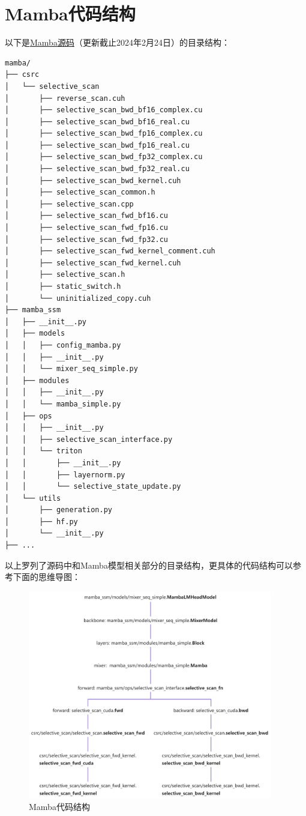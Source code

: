 \documentclass{ctexart}
\begin{document}
\section{Mamba代码结构}
以下是\href{https://github.com/state-spaces/mamba}{Mamba源码}（更新截止2024年2月24日）的目录结构：
\lstset{style=shell}
\begin{lstlisting}
mamba/
├── csrc
│   └── selective_scan
│       ├── reverse_scan.cuh
│       ├── selective_scan_bwd_bf16_complex.cu
│       ├── selective_scan_bwd_bf16_real.cu
│       ├── selective_scan_bwd_fp16_complex.cu
│       ├── selective_scan_bwd_fp16_real.cu
│       ├── selective_scan_bwd_fp32_complex.cu
│       ├── selective_scan_bwd_fp32_real.cu
│       ├── selective_scan_bwd_kernel.cuh
│       ├── selective_scan_common.h
│       ├── selective_scan.cpp
│       ├── selective_scan_fwd_bf16.cu
│       ├── selective_scan_fwd_fp16.cu
│       ├── selective_scan_fwd_fp32.cu
│       ├── selective_scan_fwd_kernel_comment.cuh
│       ├── selective_scan_fwd_kernel.cuh
│       ├── selective_scan.h
│       ├── static_switch.h
│       └── uninitialized_copy.cuh
├── mamba_ssm
│   ├── __init__.py
│   ├── models
│   │   ├── config_mamba.py
│   │   ├── __init__.py
│   │   └── mixer_seq_simple.py
│   ├── modules
│   │   ├── __init__.py
│   │   └── mamba_simple.py
│   ├── ops
│   │   ├── __init__.py
│   │   ├── selective_scan_interface.py
│   │   └── triton
│   │       ├── __init__.py
│   │       ├── layernorm.py
│   │       └── selective_state_update.py
│   └── utils
│       ├── generation.py
│       ├── hf.py
│       └── __init__.py
├── ...
\end{lstlisting}
以上罗列了源码中和Mamba模型相关部分的目录结构，更具体的代码结构可以参考下面的思维导图：
\begin{figure}[H]
    \centering
    \includegraphics[width=0.95\textwidth]{figures/Mamba.png}
    \caption{Mamba代码结构}
    \label{fig:mamba_structure}
\end{figure}
\end{document}
